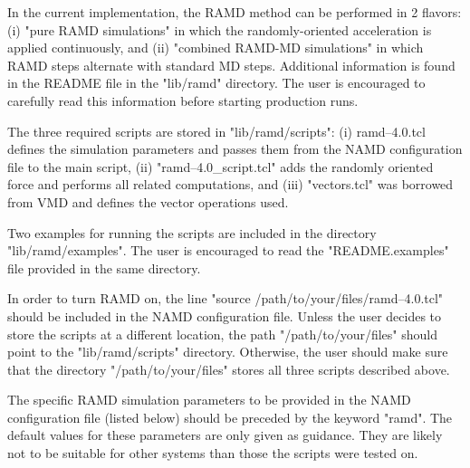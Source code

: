 In the current implementation, the RAMD method can be performed in 2 flavors: (i) "pure RAMD simulations" in which the randomly-oriented acceleration is applied continuously, and (ii) "combined RAMD-MD simulations" in which RAMD steps alternate with standard MD steps. 
Additional information is found in the README file in the "lib/ramd" directory. 
The user is encouraged to carefully read this information before starting production runs.

The three required scripts are stored in "lib/ramd/scripts": (i) ramd--4.0.tcl defines the simulation parameters and passes them from the NAMD configuration file to the main script, (ii) "ramd--4.0\_script.tcl" adds the randomly oriented force and performs all related computations, and  (iii) "vectors.tcl" was borrowed from VMD and defines the vector operations used.

Two examples for running the scripts are included in the directory "lib/ramd/examples".  
The user is encouraged to read the "README.examples" file provided in the same directory.

In order to turn RAMD on, the line "source /path/to/your/files/ramd--4.0.tcl" should be included in the NAMD configuration file. 
Unless the user decides to store the scripts at a different location, the path 
"/path/to/your/files" should point to the "lib/ramd/scripts" directory. 
Otherwise, the user should make sure that the directory "/path/to/your/files" stores all three scripts described above. 

The specific RAMD simulation parameters to be provided in the NAMD configuration file (listed below) should be preceded by the keyword "ramd". 
The default values for these parameters are only given as guidance. 
They are likely not to be suitable for other systems than those the scripts were tested on. 

